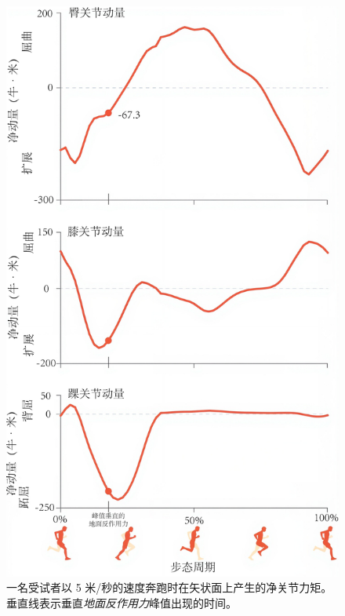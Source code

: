 \begin{figure}[!htb]
	\centering
	\includegraphics[width=0.7\linewidth]{chap9/9_8}
	\caption{一名受试者以 5 米/秒的速度奔跑时在矢状面上产生的净关节力矩。
		垂直线表示垂直\textit{地面反作用力}峰值出现的时间\cite{hamner2013muscle}。 \label{fig:9_8}}
\end{figure}


